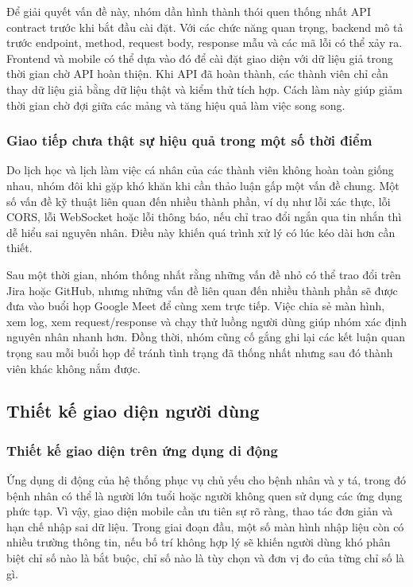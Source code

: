 \par Để giải quyết vấn đề này, nhóm dần hình thành thói quen thống nhất API contract trước khi bắt đầu cài đặt. Với các chức năng quan trọng, backend mô tả trước endpoint, method, request body, response mẫu và các mã lỗi có thể xảy ra. Frontend và mobile có thể dựa vào đó để cài đặt giao diện với dữ liệu giả trong thời gian chờ API hoàn thiện. Khi API đã hoàn thành, các thành viên chỉ cần thay dữ liệu giả bằng dữ liệu thật và kiểm thử tích hợp. Cách làm này giúp giảm thời gian chờ đợi giữa các mảng và tăng hiệu quả làm việc song song.

\subsubsection{Giao tiếp chưa thật sự hiệu quả trong một số thời điểm}
\par Do lịch học và lịch làm việc cá nhân của các thành viên không hoàn toàn giống nhau, nhóm đôi khi gặp khó khăn khi cần thảo luận gấp một vấn đề chung. Một số vấn đề kỹ thuật liên quan đến nhiều thành phần, ví dụ như lỗi xác thực, lỗi CORS, lỗi WebSocket hoặc lỗi thông báo, nếu chỉ trao đổi ngắn qua tin nhắn thì dễ hiểu sai nguyên nhân. Điều này khiến quá trình xử lý có lúc kéo dài hơn cần thiết.

\par Sau một thời gian, nhóm thống nhất rằng những vấn đề nhỏ có thể trao đổi trên Jira hoặc GitHub, nhưng những vấn đề liên quan đến nhiều thành phần sẽ được đưa vào buổi họp Google Meet để cùng xem trực tiếp. Việc chia sẻ màn hình, xem log, xem request/response và chạy thử luồng người dùng giúp nhóm xác định nguyên nhân nhanh hơn. Đồng thời, nhóm cũng cố gắng ghi lại các kết luận quan trọng sau mỗi buổi họp để tránh tình trạng đã thống nhất nhưng sau đó thành viên khác không nắm được.

\subsection{Thiết kế giao diện người dùng}

\subsubsection{Thiết kế giao diện trên ứng dụng di động}
\par Ứng dụng di động của hệ thống phục vụ chủ yếu cho bệnh nhân và y tá, trong đó bệnh nhân có thể là người lớn tuổi hoặc người không quen sử dụng các ứng dụng phức tạp. Vì vậy, giao diện mobile cần ưu tiên sự rõ ràng, thao tác đơn giản và hạn chế nhập sai dữ liệu. Trong giai đoạn đầu, một số màn hình nhập liệu còn có nhiều trường thông tin, nếu bố trí không hợp lý sẽ khiến người dùng khó phân biệt chỉ số nào là bắt buộc, chỉ số nào là tùy chọn và đơn vị đo của từng chỉ số là gì.

